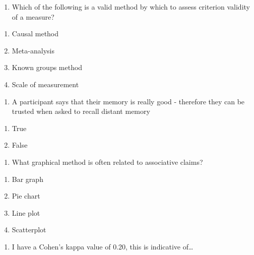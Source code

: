 \documentclass[
  12pt,
  letterpaper,
  DIV=11,
  numbers=noendperiod]{scrartcl}
\providecommand{\tightlist}{%
  \setlength{\itemsep}{0pt}\setlength{\parskip}{0pt}}\usepackage{longtable,booktabs,array}
\begin{document}
\begin{enumerate}
\def\labelenumi{\arabic{enumi}.}
\setcounter{enumi}{27}
\tightlist
\item
  Which of the following is a valid method by which to assess criterion
  validity of a measure?
\end{enumerate}

\begin{enumerate}
\def\labelenumi{\alph{enumi}.}
\tightlist
\item
  Causal method
\item
  Meta-analysis
\item
  Known groups method
\item
  Scale of measurement
\end{enumerate}

\begin{enumerate}
\def\labelenumi{\arabic{enumi}.}
\setcounter{enumi}{28}
\tightlist
\item
  A participant says that their memory is really good - therefore they
  can be trusted when asked to recall distant memory
\end{enumerate}

\begin{enumerate}
\def\labelenumi{\alph{enumi}.}
\tightlist
\item
  True
\item
  False
\end{enumerate}

\newpage{}

\begin{enumerate}
\def\labelenumi{\arabic{enumi}.}
\setcounter{enumi}{29}
\tightlist
\item
  What graphical method is often related to associative claims?
\end{enumerate}

\begin{enumerate}
\def\labelenumi{\alph{enumi}.}
\tightlist
\item
  Bar graph
\item
  Pie chart
\item
  Line plot
\item
  Scatterplot
\end{enumerate}

\begin{enumerate}
\def\labelenumi{\arabic{enumi}.}
\setcounter{enumi}{30}
\tightlist
\item
  I have a Cohen's kappa value of 0.20, this is indicative of\ldots{}
\end{enumerate}
\end{document}
